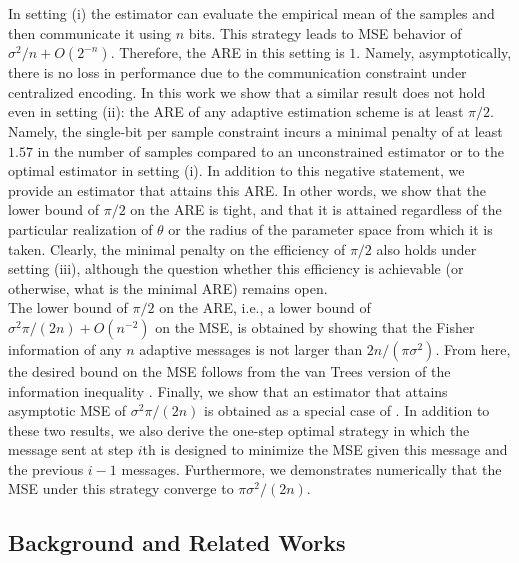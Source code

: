 \documentclass[letterpaper, conference,9pt]{IEEEtran}      %
\begin{document}
In setting (i) the estimator can evaluate the empirical mean of the samples and then communicate it using $n$ bits. This strategy leads to MSE behavior of $\sigma^2/n + O(2^{-n})$. Therefore, the ARE in this setting is $1$. Namely, asymptotically, there is no loss in performance due to the communication constraint under centralized encoding. In this work we show that a similar result does not hold even in setting (ii): the ARE of any adaptive estimation scheme is at least $\pi/2$. Namely, the single-bit per sample constraint incurs a minimal penalty of at least $1.57$ in the number of samples compared to an unconstrained estimator or to the optimal estimator in setting (i). In addition to this negative statement, we provide an estimator that attains this ARE. In other words, we show that the lower bound of $\pi/2$ on the ARE is tight, and that it is attained regardless of the particular realization of $\theta$ or the radius of the parameter space from which it is taken. Clearly, the minimal penalty on the efficiency of $\pi/2$ also holds under setting (iii), although the question whether this efficiency is achievable (or otherwise, what is the minimal ARE) remains open. 
\\

The lower bound of $\pi/2$ on the ARE, i.e., a lower bound of $\sigma^2\pi/(2n) +O(n^{-2})$ on the MSE, is obtained by showing that the Fisher information of any $n$ adaptive messages is not larger than $2n/(\pi \sigma^2)$. From here, the desired bound on the MSE follows from the van Trees version of the information inequality \cite{gill1995applications}. Finally, we show that an estimator that attains asymptotic MSE of $\sigma^2\pi/(2n)$ is obtained as a special case of \cite[Thm. 4]{polyak1992acceleration}. In addition to these two results, we also derive the one-step optimal strategy in which the message sent at step $i$th is designed to minimize the MSE given this message and the previous $i-1$ messages. Furthermore, we demonstrates numerically that the MSE under this strategy converge to $\pi \sigma^2/(2n)$. %

\subsection*{Background and Related Works}
\end{document}
